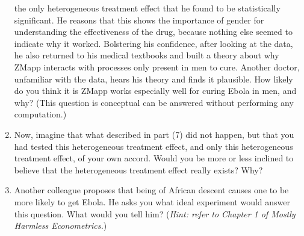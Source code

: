 \documentclass[
]{article}
\begin{document}
\begin{enumerate}
  the only heterogeneous treatment effect that he found to be
  statistically significant. He reasons that this shows the importance
  of gender for understanding the effectiveness of the drug, because
  nothing else seemed to indicate why it worked. Bolstering his
  confidence, after looking at the data, he also returned to his medical
  textbooks and built a theory about why ZMapp interacts with processes
  only present in men to cure. Another doctor, unfamiliar with the data,
  hears his theory and finds it plausible. How likely do you think it is
  ZMapp works especially well for curing Ebola in men, and why? (This
  question is conceptual can be answered without performing any
  computation.)
\item
  Now, imagine that what described in part (7) did not happen, but that
  you had tested this heterogeneous treatment effect, and only this
  heterogeneous treatment effect, of your own accord. Would you be more
  or less inclined to believe that the heterogeneous treatment effect
  really exists? Why?
\item
  Another colleague proposes that being of African descent causes one to
  be more likely to get Ebola. He asks you what ideal experiment would
  answer this question. What would you tell him? (\emph{Hint: refer to
  Chapter 1 of Mostly Harmless Econometrics.})
\end{enumerate}
\end{document}
